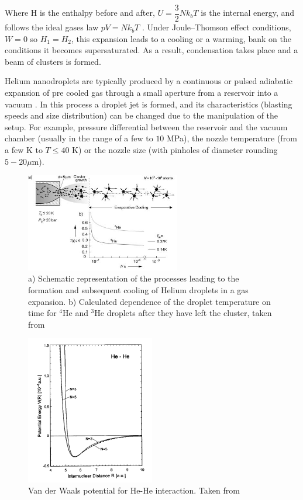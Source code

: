 Where H is the enthalpy before and after, $U=\dfrac{3}{2}Nk_{b}T$ is the internal energy, and follows the  ideal gases law $pV=Nk_{b}T$ \cite{enss_low-temperature_2005}. Under Joule–Thomson effect conditions, $W=0$ so $H_{1}=H_{2}$, this expansion leads to a cooling or a warming,  bank on the conditions it becomes supersaturated. As a result, condensation takes place and a beam of clusters is formed.

Helium nanodroplets are typically produced by a continuous or pulsed adiabatic expansion of pre cooled gas through a small aperture from a reservoir into a vacuum \cite{stienkemeier_spectroscopy_2006}. In this process a droplet jet is formed, and its characteristics (blasting speeds and size distribution) can be changed due to the manipulation of the setup. For example, pressure differential between the reservoir and the vacuum chamber (usually in the range of a few to $10$ MPa), the nozzle temperature (from a few K to $T \leqslant 40$ K) or the nozzle size (with pinholes of diameter rounding $5-20 \mu$m).



\begin{figure}[h!]
\centering
	\includegraphics[width=0.6\textwidth]{../Images/jet_scketch.png}
	\caption[Scheme for a nozzle expansion]{ a) Schematic representation of the processes leading to the formation and subsequent cooling of Helium droplets in a gas expansion. b) Calculated dependence of the droplet temperature on time for $^{4}$He and $^{3}$He droplets after they have left the cluster, taken from \cite{toennies_superfluid_2004}	}
	\label{img:jet}	
\end{figure}

\begin{figure}[h!]
\centering
	\includegraphics[width=0.5\textwidth]{../Images/waanderwaal_hehe.PNG}
	\caption[Waan der Wall He-He potential]{ Van der Waals potential for He-He interaction. Taken from \cite{blanco_quantum_2010}}
	\label{img:WanderHe}
\end{figure}

